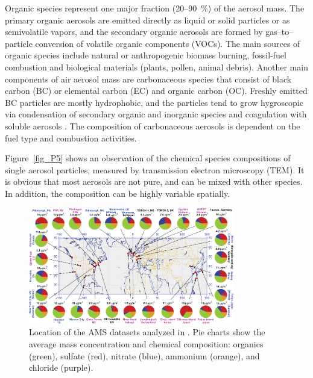 \documentclass[12pt, fullpage]{uiucthesis2009}
\begin{document}
	Organic species represent one major fraction (20--90~$\%$) of the aerosol mass. The primary organic aerosols are emitted directly as liquid or solid particles or as semivolatile vapors, and the secondary organic aerosols are formed by gas--to--particle conversion of volatile organic components (VOCs). The main sources of organic species include natural or anthropogenic biomass burning, fossil-fuel combustion and biological materials (plants, pollen, animal debris)\citep{poschl2005}. Another main components of air aerosol mass are carbonaceous species that consist of black carbon (BC) or elemental carbon (EC) and organic carbon (OC). Freshly emitted BC particles are mostly hydrophobic, and the particles tend to grow hygroscopic via condensation of secondary organic and inorganic species and coagulation with soluble aerosols \citep{riemer2010estimating}. The composition of carbonaceous aerosols is dependent on the fuel type and combustion activities.
	
	Figure~\ref{fig_P5} shows an observation of the chemical species compositions of single aerosol particles, measured by transmission electron microscopy (TEM). It is obvious that most aerosols are not pure, and can be mixed with other species. In addition, the composition can be highly variable spatially. 
	\begin{figure}[h] 
		\begin{center}
			\includegraphics[width = 0.8\textwidth]{Figure27}
			\caption[Location of the AMS datasets analyzed in \citet{Zhang2015}. Pie charts show the average mass concentration and chemical composition: organics (green), sulfate (red), nitrate (blue), ammonium (orange), and chloride (purple)]{\label{fig_P27} Location of the AMS datasets analyzed in \citet{Zhang2015}. Pie charts show the average mass concentration and chemical composition: organics (green), sulfate (red), nitrate (blue), ammonium (orange), and chloride (purple).}
		\end{center}
	\end{figure}
	
\end{document}
